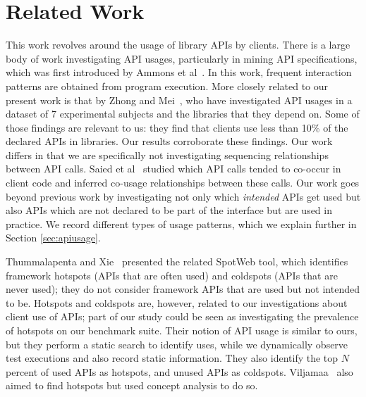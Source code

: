 \chapter{Related Work}
\label{sec:related}

This work revolves around the usage of library APIs by clients. There is a large body of work investigating API usages, particularly in mining API specifications, which was first introduced by Ammons et al~\cite{AmmonsETAL02MiningSpecifications}. In this work, frequent interaction patterns are obtained from program execution. More closely related to our present work is that by Zhong and Mei~\cite{zhong19:_empir_study_api_usages}, who have investigated API usages in a dataset of 7 experimental subjects and the libraries that they depend on. Some of those findings are relevant to us: they find that clients use less than 10\% of the declared APIs in libraries. Our results corroborate these findings. Our work differs in that we are specifically not investigating sequencing relationships between API calls. Saied et al~\cite{saied15:_minin_multi_api_usage_patter} studied which API calls tended to co-occur in client code and inferred co-usage relationships between these calls. Our work goes beyond previous work by investigating not only which \emph{intended} APIs get used but also APIs which are not declared to be part of the interface but are used in practice. We record different types of usage patterns, which we explain further in Section \ref{sec:apiusage}.

Thummalapenta and Xie~\cite{thummalapenta08:_spotw} presented the related SpotWeb tool, which identifies framework hotspots (APIs that are often used) and coldspots (APIs that are never used); they do not consider framework APIs that are used but not intended to be. Hotspots and coldspots are, however, related to our investigations about client use of APIs; part of our study could be seen as investigating the prevalence of hotspots on our benchmark suite. Their notion of API usage is similar to ours, but they perform a static search to identify uses, while we dynamically observe test executions and also record static information. They also identify the top $N$ percent of used APIs as hotspots, and unused APIs as coldspots. Viljamaa~\cite{viljamaa03:_rever_engin_framew_reuse_inter} also aimed to find hotspots but used concept analysis to do so.

